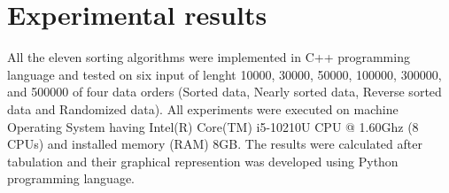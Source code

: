 \documentclass[11pt,a4paper]{article}
\begin{document}
\section{Experimental results}
All the eleven sorting algorithms were implemented in C++ programming language and tested on six input of lenght 10000,
30000, 50000, 100000, 300000, and 500000 of four data orders (Sorted data, Nearly sorted data, Reverse sorted data and Randomized data).
All experiments were executed on machine Operating System having Intel(R) Core(TM) i5-10210U CPU @ 1.60Ghz (8 CPUs) and installed memory (RAM) 8GB.
The results were calculated after tabulation and their graphical represention was developed using Python programming language.
\newline

\end{document}
